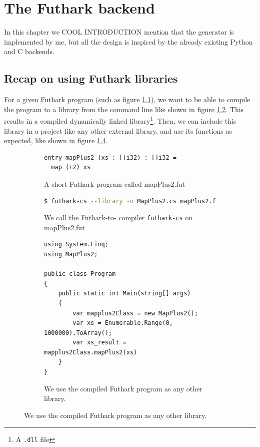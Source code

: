\chapter{The Futhark \csharp{} backend}
In this chapter we 
COOL INTRODUCTION
mention that the generator is implemented by me, but all the design is inspired
by the already existing Python and C backends.

\section{Recap on using Futhark \csharp{} libraries}
For a given Futhark program (such as figure \ref{fig:shortfutharkprogram3'}), we want to be able to compile the program to a
\csharp{} library from the command line like shown in figure \ref{fig:shortfutharkprogram4'}.
This results in a compiled \csharp{} dynamically linked library\footnote{A
  \texttt{.dll} file}.
Then, we can include this library in a \csharp{} project like any other external
library, and use its functions as expected, like shown in figure \ref{fig:shortfutharkprogram5'}.

\begin{figure}[H]
\begin{subfigure}
  \centering
  \begin{lstlisting}[language=Futhark]
entry mapPlus2 (xs : []i32) : []i32 =
  map (+2) xs
  \end{lstlisting}
  \caption{A short Futhark program called mapPlus2.fut}
  \label{fig:shortfutharkprogram3'}
\end{subfigure}

\begin{subfigure}
  \centering
  \begin{lstlisting}[language=sh]
$ futhark-cs --library -o MapPlus2.cs mapPlus2.fut
  \end{lstlisting}
  \caption{We call the Futhark-to-\csharp{} compiler \texttt{futhark-cs} on
    mapPlus2.fut}
  \label{fig:shortfutharkprogram4'}
\end{subfigure}

\begin{subfigure}
  \centering
\begin{verbatim}
using System.Linq;
using MapPlus2;

public class Program
{
    public static int Main(string[] args)
    {
        var mapplus2Class = new MapPlus2();
        var xs = Enumerable.Range(0, 1000000).ToArray();
        var xs_result = mapplus2Class.mapPlus2(xs)
    }
}
\end{verbatim}
  \caption{We use the compiled Futhark program as any other library.}
  \label{fig:shortfutharkprogram5'}
\end{subfigure}
\end{figure}

